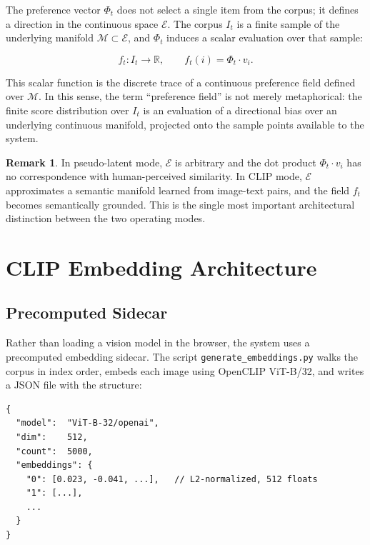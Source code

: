 \documentclass[12pt, a4paper]{article}
\theoremstyle{definition}
\newtheorem{remark}{Remark}[section]
\begin{document}
The preference vector $\Phi_t$ does not select a single item from the corpus; it defines a direction in the continuous space $\mathcal{E}$. The corpus $I_t$ is a finite sample of the underlying manifold $\mathcal{M} \subset \mathcal{E}$, and $\Phi_t$ induces a scalar evaluation over that sample:

\begin{equation}
f_t : I_t \to \mathbb{R}, \qquad f_t(i) = \Phi_t \cdot v_i.
\end{equation}

This scalar function is the discrete trace of a continuous preference field defined over $\mathcal{M}$. In this sense, the term ``preference field'' is not merely metaphorical: the finite score distribution over $I_t$ is an evaluation of a directional bias over an underlying continuous manifold, projected onto the sample points available to the system.

\begin{remark}
In pseudo-latent mode, $\mathcal{E}$ is arbitrary and the dot product $\Phi_t \cdot v_i$ has no correspondence with human-perceived similarity. In CLIP mode, $\mathcal{E}$ approximates a semantic manifold learned from image-text pairs, and the field $f_t$ becomes semantically grounded. This is the single most important architectural distinction between the two operating modes.
\end{remark}

\section{CLIP Embedding Architecture}

\subsection{Precomputed Sidecar}

Rather than loading a vision model in the browser, the system uses a precomputed embedding sidecar. The script \texttt{generate\_embeddings.py} walks the corpus in index order, embeds each image using OpenCLIP ViT-B/32, and writes a JSON file with the structure:

\begin{lstlisting}[language={}, caption={Sidecar JSON structure}]
{
  "model":  "ViT-B-32/openai",
  "dim":    512,
  "count":  5000,
  "embeddings": {
    "0": [0.023, -0.041, ...],   // L2-normalized, 512 floats
    "1": [...],
    ...
  }
}
\end{lstlisting}
\end{document}

